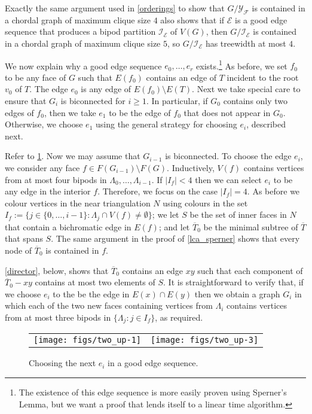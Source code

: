 \documentclass[a4paper,UKenglish,autoref]{lipics-v2021}
\begin{document}
Exactly the same argument used in \cref{orderings} to show that $G/\mathcal{Y_F}$ is contained in a chordal graph of maximum clique size $4$ also shows that if $\mathcal{E}$ is a good edge sequence that produces a bipod partition $\mathcal{I_E}$ of $V(G)$, then $G/\mathcal{I_E}$ is contained in a chordal graph of maximum clique size $5$, so $G/\mathcal{I_E}$ has treewidth at most $4$.

We now explain why a good edge sequence $e_0,\ldots,e_r$ exists.\footnote{The existence of this edge sequence is more easily proven using Sperner's Lemma, but we want a proof that lends itself to a linear time algorithm.}  As before, we set $f_0$ to be any face of $G$ such that $E(f_0)$ contains an edge of $T$ incident to the root $v_0$ of $T$.  The edge $e_0$ is any edge of $E(f_0)\setminus E(T)$.  Next we take special care to ensure that $G_i$ is biconnected for $i\ge 1$.  In particular, if $G_0$ contains only two edges of $f_0$, then we take $e_1$ to be the edge of $f_0$ that does not appear in $G_0$.  Otherwise, we choose $e_1$ using the general strategy for choosing $e_i$, described next.

Refer to \cref{e_i}.  Now we may assume that $G_{i-1}$ is biconnected. To choose the edge $e_i$, we consider any face $f\in F(G_{i-1})\setminus F(G)$. Inductively, $V(f)$ contains vertices from at most four bipods in $\Lambda_0,\ldots,\Lambda_{i-1}$. If $|I_f| < 4$ then we can select $e_i$ to be any edge in the interior $f$. Therefore, we focus on the case $|I_f| = 4$. As before we colour vertices in the near triangulation $N$ using colours in the set $I_f:=\{j\in\{0,\ldots,i-1\}:\Lambda_j\cap V(f)\neq\emptyset\}$; we let $S$ be the set of inner faces in $N$ that contain a bichromatic edge in $E(f)$; and let $\overline{T}_0$ be the minimal subtree of $\overline{T}$ that spans $S$.  The same argument in the proof of \cref{lca_sperner} shows that every node of $\overline{T}_0$ is contained in $f$.

\cref{director}, below, shows that $\overline{T}_0$ contains an edge $xy$ such that each component of $\overline{T}_0-xy$ contains at most two elements of $S$.  It is straightforward to verify that, if we choose $e_i$ to the be the edge in $E(x)\cap E(y)$ then we obtain a graph $G_i$ in which each of the two new faces containing vertices from $\Lambda_i$ contains vertices from at most three bipods in $\{\Lambda_j:j\in I_f\}$, as required.

\begin{figure}[htbp]
  \begin{center}
    \begin{tabular}{cc}
       \texttt{[image: figs/two\_up-1]} &
       \texttt{[image: figs/two\_up-3]}
     \end{tabular}
  \end{center}
  \caption{Choosing the next $e_i$ in a  good edge sequence.}
  \label{e_i}
\end{figure}
\end{document}
